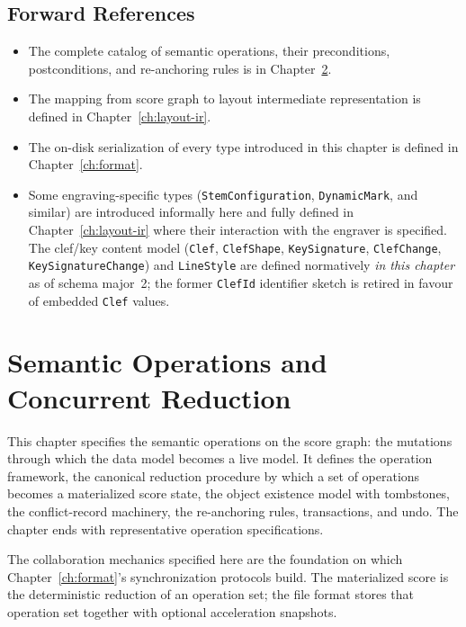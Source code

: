 \documentclass[11pt,letterpaper]{report}
\begin{document}
\section{Forward References}

\begin{itemize}
  \item The complete catalog of semantic operations, their
    preconditions, postconditions, and re-anchoring rules is in
    Chapter~\ref{ch:semops}.
  \item The mapping from score graph to layout intermediate
    representation is defined in Chapter~\ref{ch:layout-ir}.
  \item The on-disk serialization of every type introduced in this
    chapter is defined in Chapter~\ref{ch:format}.
  \item Some engraving-specific types (\texttt{StemConfiguration},
    \texttt{DynamicMark}, and similar) are introduced informally
    here and fully defined in Chapter~\ref{ch:layout-ir} where their
    interaction with the engraver is specified. The clef/key content
    model (\texttt{Clef}, \texttt{ClefShape}, \texttt{KeySignature},
    \texttt{ClefChange}, \texttt{KeySignatureChange}) and
    \texttt{LineStyle} are defined normatively \emph{in this chapter}
    as of schema major~2; the former \texttt{ClefId} identifier sketch
    is retired in favour of embedded \texttt{Clef} values.
\end{itemize}

\chapter{Semantic Operations and Concurrent Reduction}
\label{ch:semops}

This chapter specifies the semantic operations on the score graph: the
mutations through which the data model becomes a live model. It defines
the operation framework, the canonical reduction procedure by which a
set of operations becomes a materialized score state, the object
existence model with tombstones, the conflict-record machinery, the
re-anchoring rules, transactions, and undo. The chapter ends with
representative operation specifications.

The collaboration mechanics specified here are the foundation on which
Chapter~\ref{ch:format}'s synchronization protocols build. The
materialized score is the deterministic reduction of an operation set;
the file format stores that operation set together with optional
acceleration snapshots.
\end{document}
